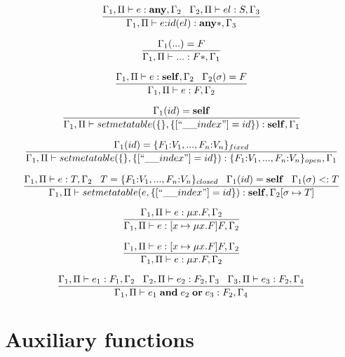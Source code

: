 \[
\dfrac{\Gamma_{1}, \Pi \vdash e:\mathbf{any}, \Gamma_{2} \;\;\;
       \Gamma_{2}, \Pi \vdash el:S, \Gamma_{3}}
      {\Gamma_{1}, \Pi \vdash e{:}id(el):\mathbf{any}{*}, \Gamma_{3}}
\]

\[
\dfrac{\Gamma_{1}({...}) = F}
      {\Gamma_{1}, \Pi \vdash {...}:F{*}, \Gamma_{1}}
\]

\[
\dfrac{\Gamma_{1}, \Pi \vdash e:\mathbf{self}, \Gamma_{2} \;\;\;
       \Gamma_{2}(\sigma) = F}
      {\Gamma_{1}, \Pi \vdash e:F, \Gamma_{2}}
\]

\[
\dfrac{\env_{1}(id) = \Self}
      {\env_{1}, \penv \vdash setmetatable(\{\}, \{[``\string_\string_index"] = id\}):\Self, \env_{1}}
\]

\[
\dfrac{\env_{1}(id) = \{F_{1}{:}V_{1}, ..., F_{n}{:}V_{n}\}_{fixed}}
      {\env_{1}, \penv \vdash setmetatable(\{\}, \{[``\string_\string_index"] = id\}):\{F_{1}{:}V_{1}, ..., F_{n}{:}V_{n}\}_{open}, \env_{1}}
\]

\[
\dfrac{\env_{1}, \penv \vdash e : T, \env_{2} \;\;\;
       T = \{F_{1}{:}V_{1}, ..., F_{n}{:}V_{n}\}_{closed} \;\;\;
       \env_{1}(id) = \Self \;\;\; \env_{1}(\sigma) \subtype T}
      {\env_{1}, \penv \vdash setmetatable(e, \{[``\string_\string_index"] = id\}):\Self, \env_{2}[\sigma \mapsto T]}
\]

\[
\dfrac{\Gamma_{1}, \Pi \vdash e:\mu x.F, \Gamma_{2}}
      {\Gamma_{1}, \Pi \vdash e:[x \mapsto \mu x.F]F, \Gamma_{2}}
\]

\[
\dfrac{\Gamma_{1}, \Pi \vdash e:[x \mapsto \mu x.F]F, \Gamma_{2}}
      {\Gamma_{1}, \Pi \vdash e:\mu x.F, \Gamma_{2}}
\]

\[
\dfrac{\Gamma_{1}, \Pi \vdash e_{1}:F_{1}, \Gamma_{2} \;\;\;
       \Gamma_{2}, \Pi \vdash e_{2}:F_{2}, \Gamma_{3} \;\;\;
       \Gamma_{3}, \Pi \vdash e_{3}:F_{2}, \Gamma_{4}}
      {\Gamma_{1}, \Pi \vdash e_{1} \; \mathbf{and} \; e_{2} \; \mathbf{or} \; e_{3}:F_{2}, \Gamma_{4}}
\]

\section{Auxiliary functions}

\noindent

